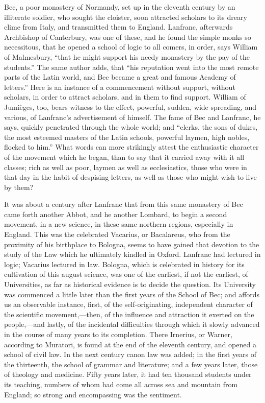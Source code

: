 Bec, a poor monastery of
Normandy, set up in the eleventh century by an illiterate soldier, who
sought the cloister, soon attracted scholars to its dreary clime from
Italy, and transmitted them to England. Lanfranc, afterwards
Archbishop of Canterbury, was one of these, and he found the simple
monks so necessitous, that he opened a school of logic to all comers,
in order, says William of Malmesbury, ``that he might support his
needy monastery by the pay of the students.'' The same author adds,
that ``his reputation went into the most remote parts of the Latin
world, and Bec became a great and famous Academy of letters.'' Here
is an instance of a commencement without support, without scholars, in
order to attract scholars, and in them to find support. William of
Jumièges, too, bears witness to the effect, powerful, sudden, wide
spreading, and various, of Lanfranc's advertisement of himself. The
fame of Bec and Lanfranc, he says, quickly penetrated through the
whole world; and ``clerks, the sons of dukes, the most esteemed
masters of the Latin schools, powerful laymen, high nobles,
flocked to him.'' What words can more strikingly attest the
enthusiastic character of the movement which he began, than to say
that it carried away with it all classes; rich as well as poor, laymen
as well as ecclesiastics, those who were in that day in the habit of
despising letters, as well as those who might wish to live by them?

It was about a century after
Lanfranc that from this same monastery of Bec came forth another
Abbot, and he another Lombard, to begin a second movement, in a new
science, in these same northern regions, especially in England. This
was the celebrated Vacarius, or Bacalareus, who from the proximity of
his birthplace to Bologna, seems to have gained that devotion to the
study of the Law which he ultimately kindled in Oxford. Lanfranc had
lectured in logic; Vacarius lectured in law. Bologna, which is
celebrated in history for its cultivation of this august science, was
one of the earliest, if not the earliest, of Universities, as far as
historical evidence is to decide the question. Its University was
commenced a little later than the first years of the School of Bec;
and affords us an observable instance, first, of the self-originating,
independent character of the scientific movement,—then, of the
influence and attraction it exerted on the people,—and lastly, of
the incidental difficulties through which it slowly advanced in the
course of many years to its completion. There Irnerius, or Warner,
according to Muratori, is found at the end of the eleventh century,
and opened a school of civil law. In the next century canon law was
added; in the first years of the thirteenth, the school of grammar and
literature; and a few years later, those of theology and medicine.
Fifty years later, it had ten thousand students under its teaching,
numbers of whom had come all across sea and mountain from
England; so strong and encompassing was the sentiment.

